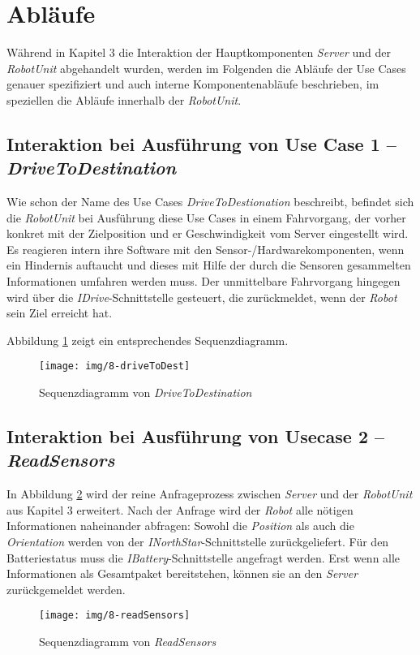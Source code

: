 \section{Abläufe}

Während in Kapitel 3 die Interaktion der Hauptkomponenten \emph{Server} und der \emph{RobotUnit} abgehandelt wurden, werden im Folgenden die Abläufe der Use Cases genauer spezifiziert und auch interne Komponentenabläufe beschrieben, im speziellen die Abläufe innerhalb der \emph{RobotUnit}.
	
	\subsection*{Interaktion bei Ausführung von Use Case 1 – \emph{DriveToDestination}}
	Wie schon der Name des Use Cases \emph{DriveToDestionation} beschreibt, befindet sich die \emph{RobotUnit} bei Ausführung diese Use Cases in einem Fahrvorgang, der vorher konkret mit der Zielposition und er Geschwindigkeit vom Server eingestellt wird. Es reagieren intern ihre Software mit den Sensor-/Hardwarekomponenten, wenn ein Hindernis auftaucht und dieses mit Hilfe der durch die Sensoren gesammelten Informationen umfahren werden muss. Der unmittelbare Fahrvorgang hingegen wird über die \emph{IDrive}-Schnittstelle gesteuert, die zurückmeldet, wenn der \emph{Robot} sein Ziel erreicht hat.
	
	Abbildung \ref{DriveToDestination} zeigt ein entsprechendes Sequenzdiagramm.
	
	\begin{figure}[H]
		\centering
		\texttt{[image: img/8-driveToDest]}
		\caption{Sequenzdiagramm von \emph{DriveToDestination}}
		\label{DriveToDestination}
	\end{figure}
	
	
	\subsection*{Interaktion bei Ausführung von Usecase 2 – \emph{ReadSensors}}
	In Abbildung \ref{ReadSensors} wird der reine Anfrageprozess zwischen \emph{Server} und der \emph{RobotUnit} aus Kapitel 3 erweitert. Nach der Anfrage wird der \emph{Robot} alle nötigen Informationen naheinander abfragen: Sowohl die \emph{Position} als auch die \emph{Orientation} werden von der \emph{INorthStar}-Schnittstelle zurückgeliefert. Für den Batteriestatus muss die \emph{IBattery}-Schnittstelle angefragt werden. Erst wenn alle Informationen als Gesamtpaket bereitstehen, können sie an den \emph{Server} zurückgemeldet werden.\\
	\begin{figure}[H]
		\centering
		\texttt{[image: img/8-readSensors]}
		\caption{Sequenzdiagramm von \emph{ReadSensors}}
		\label{ReadSensors}
	\end{figure}
	
